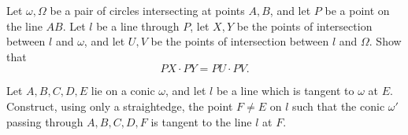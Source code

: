 \begin{exer} Let $\omega, \Omega$ be a pair of circles intersecting at points $A,B$, and let $P$ be a point on the line $AB$. Let $l$ be a line through $P$, let $X,Y$ be the points of intersection between $l$ and $\omega$, and let $U,V$ be the points of intersection between $l$ and $\Omega$. Show that
\[
PX\cdot PY = PU\cdot PV.
\]
\end{exer}

\begin{exer} Let $A,B,C,D,E$ lie on a conic $\omega$, and let $l$ be a line which is tangent to $\omega$ at $E$. Construct, using only a straightedge, the point $F \ne E$ on $l$ such that the conic $\omega'$ passing through $A,B,C,D,F$ is tangent to the line $l$ at $F$.
\end{exer}

